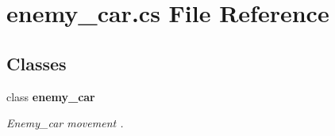 \section{enemy\+\_\+car.\+cs File Reference}
\label{enemy__car_8cs}
\subsection*{Classes}
\begin{DoxyCompactItemize}
\item 
class {\bf enemy\+\_\+car}
\begin{DoxyCompactList}\small\item\em Enemy\+\_\+car movement . \end{DoxyCompactList}\end{DoxyCompactItemize}
